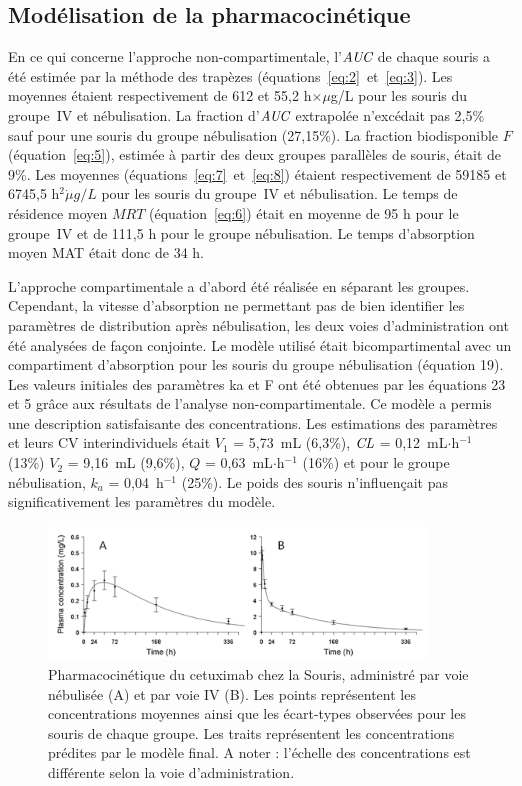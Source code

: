 \subsection{Modélisation de la pharmacocinétique}
En ce qui concerne l'approche non-compartimentale, l'$\operatorname{\textit{AUC}}$ de chaque souris a été estimée par la méthode des trapèzes (équations~\ref{eq:2}~et~\ref{eq:3}). Les moyennes étaient respectivement de 612 et 55,2 h$\times \mu$g/L pour les souris du groupe~IV et nébulisation. La fraction d'$\operatorname{\textit{AUC}}$ extrapolée n'excédait pas 2,5\% sauf pour une souris du groupe nébulisation (27,15\%). La fraction biodisponible $F$ (équation~\ref{eq:5}), estimée à partir des deux groupes parallèles de souris, était de 9\%. Les moyennes (équations~\ref{eq:7}~et~\ref{eq:8}) étaient respectivement de 59185 et 6745,5 h$^2\dot \mu g/L$ pour les souris du groupe~IV et nébulisation. Le temps de résidence moyen $MRT$ (équation~\ref{eq:6}) était en moyenne de 95 h pour le groupe~IV et de 111,5 h pour le groupe nébulisation. Le temps d'absorption moyen MAT était donc de 34 h. 

L'approche compartimentale a d'abord été réalisée en séparant les groupes. Cependant, la vitesse d'absorption ne permettant pas de bien identifier les paramètres de distribution après nébulisation, les deux voies d'administration ont été analysées de façon conjointe. Le modèle utilisé était bicompartimental avec un compartiment d'absorption pour les souris du groupe nébulisation (équation 19). Les valeurs initiales des paramètres ka et F ont été obtenues par les équations 23 et 5 grâce aux résultats de l'analyse non-compartimentale. Ce modèle a permis une description satisfaisante des concentrations. Les estimations des paramètres et leurs CV interindividuels était $V_1$ = 5,73~mL (6,3\%), $\operatorname{\textit{CL}}$ = 0,12~mL$\cdot$h$^{-1}$ (13\%) $V_2$ = 9,16~mL (9,6\%), $Q$ = 0,63~mL$\cdot$h$^{-1}$ (16\%) et pour le groupe nébulisation, $k_a$ = 0,04~h$^{-1}$ (25\%). Le poids des souris n'influençait pas significativement les paramètres du modèle.
\begin{figure}[htbp]
	\centering
		\includegraphics[width=10cm]{figures/raster/FIG_33}
	\caption{Pharmacocinétique du cetuximab chez la Souris, administré par voie nébulisée (A) et par voie IV (B). Les points représentent les concentrations moyennes ainsi que les écart-types observées pour les souris de chaque groupe. Les traits représentent les concentrations prédites par le modèle final. A noter : l'échelle des concentrations est différente selon la voie d'administration.}
	\label{fig:33}
\end{figure}

